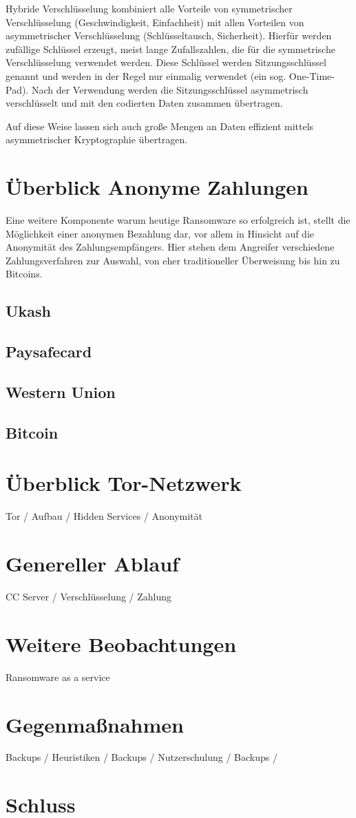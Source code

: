 Hybride Verschlüsselung kombiniert alle Vorteile von symmetrischer Verschlüsselung (Geschwindigkeit, Einfachheit) mit allen Vorteilen von asymmetrischer Verschlüsselung (Schlüsseltausch, Sicherheit).
Hierfür werden zufällige Schlüssel erzeugt, meist lange Zufallszahlen, die für die symmetrische Verschlüsselung verwendet werden. Diese Schlüssel werden Sitzungsschlüssel genannt und werden in der Regel nur einmalig verwendet (ein sog. One-Time-Pad). Nach der Verwendung werden die Sitzungsschlüssel asymmetrisch verschlüsselt und mit den codierten Daten zusammen übertragen.

Auf diese Weise lassen sich auch große Mengen an Daten effizient mittels asymmetrischer Kryptographie übertragen.




\section{Überblick Anonyme Zahlungen}
Eine weitere Komponente warum heutige Ransomware so erfolgreich ist, stellt die Möglichkeit einer anonymen Bezahlung dar, vor allem in Hinsicht auf die Anonymität des Zahlungsempfängers. Hier stehen dem Angreifer verschiedene Zahlungsverfahren zur Auswahl, von eher traditioneller Überweisung bis hin zu Bitcoins.

\subsection{Ukash}
\subsection{Paysafecard}
\subsection{Western Union}
\subsection{Bitcoin}

\section{Überblick Tor-Netzwerk}
	Tor / Aufbau / Hidden Services / Anonymität

\section{Genereller Ablauf}
 CC Server / Verschlüsselung / Zahlung

\section{Weitere Beobachtungen}
Ransomware as a service

\section{Gegenmaßnahmen}

Backups / Heuristiken / Backups / Nutzerschulung / Backups /

\section{Schluss}
